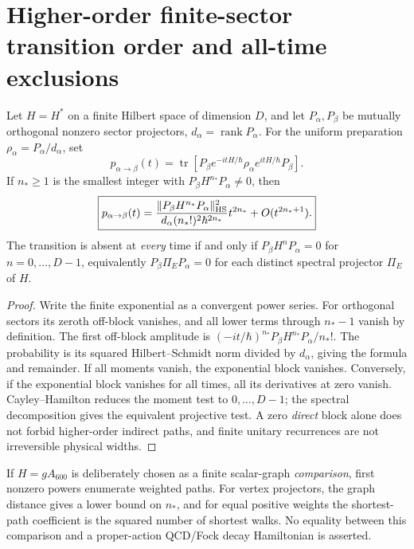 \documentclass[12pt,a4paper]{article}
\begin{document}
\section{Higher-order finite-sector transition order and all-time exclusions}
\label{p4b:sec:v3027-high-order-sector-transitions}
\begin{theorem}
\label{p4b:thm:v3027-high-order-sector-transition}
Let $H=H^*$ on a finite Hilbert space of dimension $D$, and let
$P_\alpha,P_\beta$ be mutually orthogonal nonzero sector projectors,
$d_\alpha=\operatorname{rank}P_\alpha$.
For the uniform preparation $\rho_\alpha=P_\alpha/d_\alpha$, set
\[
 p_{\alpha\to\beta}(t)=\operatorname{tr}
 \left[P_\beta e^{-itH/\hbar}\rho_\alpha
  e^{itH/\hbar}P_\beta\right].
\]
If $n_*\ge1$ is the smallest integer with
$P_\beta H^{n_*}P_\alpha\neq0$, then
\[
\boxed{p_{\alpha\to\beta}(t)
=\frac{\|P_\beta H^{n_*}P_\alpha\|_{\rm HS}^2}
{d_\alpha(n_*!)^2\hbar^{2n_*}}t^{2n_*}
+O(t^{2n_*+1}).}
\]
The transition is absent at \emph{every} time if and only if
$P_\beta H^nP_\alpha=0$ for $n=0,\ldots,D-1$, equivalently
$P_\beta\Pi_E P_\alpha=0$ for each distinct spectral projector
$\Pi_E$ of $H$.
\end{theorem}
\begin{proof}
Write the finite exponential as a convergent power series. For
orthogonal sectors its zeroth off-block vanishes, and all lower
terms through $n_*-1$ vanish by definition. The first off-block
amplitude is
$(-it/\hbar)^{n_*}P_\beta H^{n_*}P_\alpha/n_*!$.
The probability is its squared Hilbert--Schmidt norm divided by
$d_\alpha$, giving the formula and remainder. If all moments vanish,
the exponential block vanishes. Conversely, if the exponential block
vanishes for all times, all its derivatives at zero vanish.
Cayley--Hamilton reduces the moment test to $0,\ldots,D-1$;
the spectral decomposition gives the equivalent projective test.
A zero \emph{direct} block alone does not forbid higher-order
indirect paths, and finite unitary recurrences are not irreversible
physical widths.
\end{proof}
\begin{remark}
\label{p4b:rem:v3027-hurwitz-path-comparison}
If $H=gA_{600}$ is deliberately chosen as a finite scalar-graph
\emph{comparison}, first nonzero powers enumerate weighted paths.
For vertex projectors, the graph distance gives a lower bound on
$n_*$, and for equal positive weights the shortest-path coefficient
is the squared number of shortest walks. No equality between this
comparison and a proper-action QCD/Fock decay Hamiltonian is asserted.
\end{remark}
\end{document}
